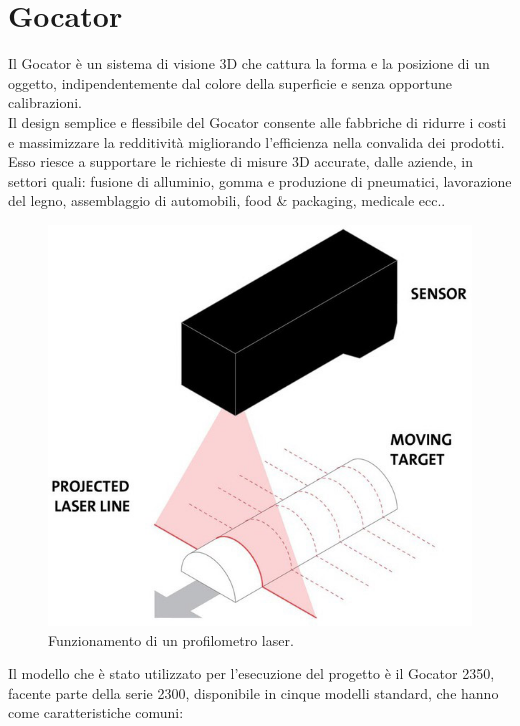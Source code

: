 \chapter{Gocator}
\label{Cha:gocator}
\thispagestyle{empty}

Il Gocator è un sistema di visione 3D che cattura la forma e la posizione di un oggetto, indipendentemente dal colore della superficie e senza opportune calibrazioni.\\
\newline
Il design semplice e flessibile del Gocator consente alle fabbriche di ridurre i costi e massimizzare la redditività migliorando l'efficienza nella convalida dei prodotti. Esso riesce a supportare le richieste di misure 3D accurate, dalle aziende, in settori quali: fusione di alluminio, gomma e produzione di pneumatici, lavorazione del legno, assemblaggio di automobili, food \& packaging, medicale ecc..\\

\begin{figure}[H]
	\centering
	\includegraphics[scale=0.30]{./pictures/gocator_1.jpg}
	\caption{Funzionamento di un profilometro laser.}\label{fig:gocator_1}
\end{figure}

\newpage

\noindent Il modello che è stato utilizzato per l'esecuzione del progetto è il Gocator 2350, facente parte della serie 2300, disponibile in cinque modelli standard, che hanno come caratteristiche comuni:

